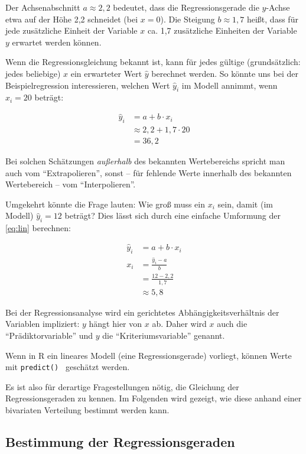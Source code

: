 \documentclass[
  ngerman,
]{article}
\begin{document}
Der Achsenabschnitt \(a\approx2,2\) bedeutet, dass die Regressionsgerade die \(y\)-Achse etwa auf der Höhe 2,2 schneidet (bei \(x=0\)). Die Steigung \(b\approx1,7\) heißt, dass für jede zusätzliche Einheit der Variable \(x\) ca. 1,7 zusätzliche Einheiten der Variable \(y\) erwartet werden können.

Wenn die Regressionsgleichung bekannt ist, kann für jedes gültige (grundsätzlich: jedes beliebige) \(x\) ein erwarteter Wert \(\hat{y}\) berechnet werden. So könnte uns bei der Beispielregression interessieren, welchen Wert \(\hat{y}_i\) im Modell annimmt, wenn \(x_i=20\) beträgt:

\[\begin{aligned}
\hat{y}_i&=a+b\cdot x_i\\
   &\approx2,2+1,7\cdot20\\
   &=36,2
\end{aligned}\]

Bei solchen Schätzungen \emph{außerhalb} des bekannten Wertebereichs spricht man auch vom ``Extrapolieren'', sonst -- für fehlende Werte innerhalb des bekannten Wertebereich -- vom ``Interpolieren''.

Umgekehrt könnte die Frage lauten: Wie groß muss ein \(x_i\) sein, damit (im Modell) \(\hat{y}_i=12\) beträgt? Dies lässt sich durch eine einfache Umformung der \autoref{eq:lin} berechnen:

\[\begin{aligned}
\hat{y}_i&=a+b\cdot x_i\\[5pt]
x_i&=\frac{\hat{y}_i-a}{b}\\[5pt]
&=\frac{12-2,2}{1,7}\\
   &\approx5,8
\end{aligned}\]

Bei der Regressionsanalyse wird ein gerichtetes Abhängigkeitsverhältnis der Variablen impliziert: \(y\) hängt hier von \(x\) ab. Daher wird \(x\) auch die ``Prädiktorvariable'' und \(y\) die ``Kriteriumsvariable'' genannt.

\begin{rtip}
Wenn in R ein lineares Modell (eine Regressionsgerade) vorliegt, können Werte mit {\tt predict() } geschätzt werden.
\end{rtip}

Es ist also für derartige Fragestellungen nötig, die Gleichung der Regressionsgeraden zu kennen. Im Folgenden wird gezeigt, wie diese anhand einer bivariaten Verteilung bestimmt werden kann.

\hypertarget{bestimmung-der-regressionsgeraden}{%
\subsection{Bestimmung der Regressionsgeraden}\label{bestimmung-der-regressionsgeraden}}
\end{document}
